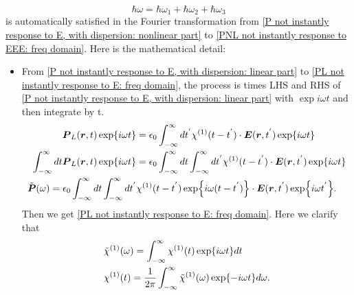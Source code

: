 \documentclass[12pt]{extarticle}
\numberwithin{equation}{section}
\numberwithin{figure}{section}
\numberwithin{table}{section}
\newcommand{\<}{\langle}
\renewcommand{\>}{\rangle}
\theoremstyle{definition}
\begin{document}
\begin{itemize}
                \begin{equation}
                    \hbar \omega = \hbar \omega_1 +\hbar \omega_2+\hbar \omega_3
                    \label{photonic energy conservation: four wave expression}
                \end{equation}
                is automatically satisfied in the Fourier transformation from \autoref{P not instantly response to E, with dispersion: nonlinear part} to \autoref{PNL not instantly response to EEE: freq domain}. Here is the mathematical detail:
                \begin{itemize}
                    \item From \autoref{P not instantly response to E, with dispersion: linear part} to \autoref{PL not instantly response to E: freq domain}, the process is times LHS and RHS of \autoref{P not instantly response to E, with dispersion: linear part} with $\exp{i\omega t}$ and then integrate by t.
                    \begin{subequations}
                    \begin{align}
                        \boldsymbol{P}_L(\boldsymbol{r},t)\exp{i\omega t}&=\epsilon_0\int_{-\infty}^\infty dt^{'}\chi^{(1)}(t-t^{'})\cdot\boldsymbol{E}(\boldsymbol{r},t^{'})\exp{i\omega t}\\
                        \int_{-\infty}^\infty dt\boldsymbol{P}_L(\boldsymbol{r},t)\exp{i\omega t}&=\epsilon_0\int_{-\infty}^\infty dt\int_{-\infty}^\infty dt^{'}\chi^{(1)}(t-t^{'})\cdot\boldsymbol{E}(\boldsymbol{r},t^{'})\exp{i\omega t}\\
                        \Tilde{\boldsymbol{P}}(\omega)=\epsilon_0\int_{-\infty}^\infty dt\int_{-\infty}^\infty dt^{'}&\chi^{(1)}(t-t^{'})\exp{i\omega (t-t^{'})}\cdot\boldsymbol{E}(\boldsymbol{r},t^{'})\exp{i\omega t^{'}}.
                    \end{align}
                    \label{derivation of PL fourier transform: convolution theorem}
                    \end{subequations}
                    Then we get \autoref{PL not instantly response to E: freq domain}. Here we clarify that
                    \begin{subequations}
                    \begin{align}
                        &\Tilde{\chi}^{(1)}(\omega) = \int_{-\infty}^\infty  \chi^{(1)}(t)\exp{i\omega t} dt\\
                        &\chi^{(1)}(t) = \frac{1}{2\pi}\int_{-\infty}^\infty  \Tilde{\chi}^{(1)}(\omega)\exp{-i\omega t} d\omega.

\end{align}
\end{subequations}
\end{itemize}
\end{itemize}
\end{document}

